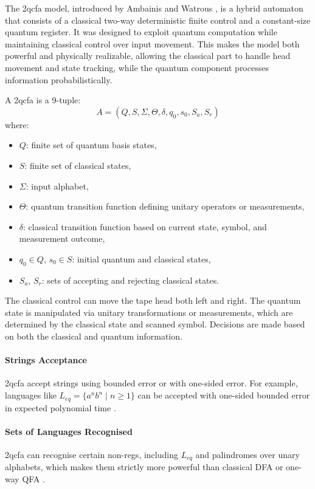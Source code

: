   
The \gls{2qcfa} model, introduced by Ambainis and Watrous \cite{ambainis2002two}, is a hybrid automaton that consists of a classical two-way deterministic finite control and a constant-size quantum register. It was designed to exploit quantum computation while maintaining classical control over input movement. This makes the model both powerful and physically realizable, allowing the classical part to handle head movement and state tracking, while the quantum component processes information probabilistically.

\begin{definition}
A \gls{2qcfa} is a 9-tuple:
\[
A = (Q, S, \Sigma, \Theta, \delta, q_0, s_0, S_a, S_r)
\]
where:
\begin{itemize}
    \item $Q$: finite set of quantum basis states,
    \item $S$: finite set of classical states,
    \item $\Sigma$: input alphabet,
    \item $\Theta$: quantum transition function defining unitary operators or measurements,
    \item $\delta$: classical transition function based on current state, symbol, and measurement outcome,
    \item $q_0 \in Q$, $s_0 \in S$: initial quantum and classical states,
    \item $S_a$, $S_r$: sets of accepting and rejecting classical states.
\end{itemize}
\end{definition}

The classical control can move the tape head both left and right. The quantum state is manipulated via unitary transformations or measurements, which are determined by the classical state and scanned symbol. Decisions are made based on both the classical and quantum information.

\paragraph{Strings Acceptance}  
\gls{2qcfa} accept strings using bounded error or with one-sided error. For example, languages like $L_{eq} = \{ a^n b^n \mid n \geq 1 \}$ can be accepted with one-sided bounded error in expected polynomial time \cite{ambainis2002two}.

\paragraph{Sets of Languages Recognised}  
\gls{2qcfa} can recognise certain non-\glspl{reg}, including $L_{eq}$ and palindromes over unary alphabets, which makes them strictly more powerful than classical DFA or one-way QFA \cite{ambainis2002two, li2015hybrid}.

